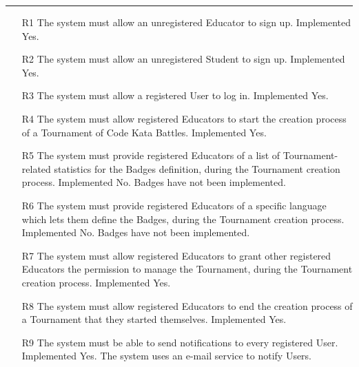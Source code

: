 \documentclass{Configuration_Files/Template}
\begin{document}
{\color{bluepoli}\rule{\linewidth}{0.1pt}}

\begin{enumerate}
    \item[\textcolor{bluepoli}{R1}] The system must allow an unregistered Educator to sign up.
    \textcolor{bluepoli}{Implemented} Yes.
    
    \item[\textcolor{bluepoli}{R2}] The system must allow an unregistered Student to sign up.
    \textcolor{bluepoli}{Implemented} Yes.
    
    \item[\textcolor{bluepoli}{R3}] The system must allow a registered User to log in.
    \textcolor{bluepoli}{Implemented} Yes.
    
    \item[\textcolor{bluepoli}{R4}] The system must allow registered Educators to start the creation process of a Tournament of Code Kata Battles.
    \textcolor{bluepoli}{Implemented} Yes.
    
    \item[\textcolor{bluepoli}{R5}] The system must provide registered Educators of a list of Tournament-related statistics for the Badges definition, during the Tournament creation process.
    \textcolor{bluepoli}{Implemented} No. Badges have not been implemented.
    
    \item[\textcolor{bluepoli}{R6}] The system must provide registered Educators of a specific language which lets them define the Badges, during the Tournament creation process.
    \textcolor{bluepoli}{Implemented} No. Badges have not been implemented.
    
    \item[\textcolor{bluepoli}{R7}] The system must allow registered Educators to grant other registered Educators the permission to manage the Tournament, during the Tournament creation process.
    \textcolor{bluepoli}{Implemented} Yes.
    
    \item[\textcolor{bluepoli}{R8}] The system must allow registered Educators to end the creation process of a Tournament that they started themselves.
    \textcolor{bluepoli}{Implemented} Yes.
    
    \item[\textcolor{bluepoli}{R9}] The system must be able to send notifications to every registered User.
    \textcolor{bluepoli}{Implemented} Yes. The system uses an e-mail service to notify Users.
    

\end{enumerate}
\end{document}
